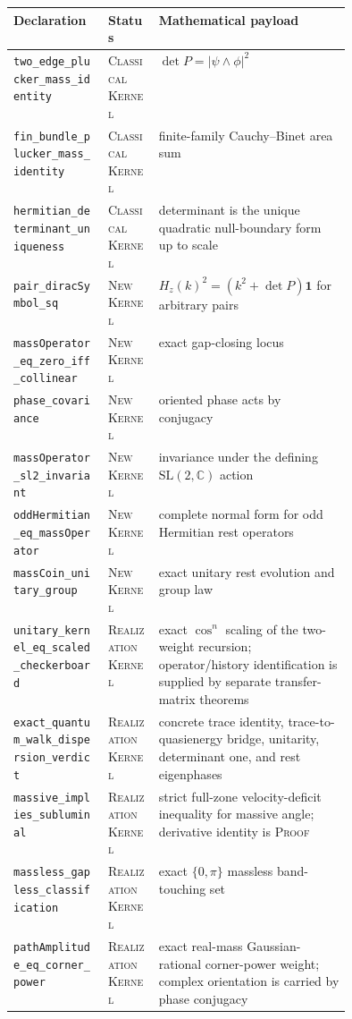 \documentclass[11pt]{article}
\newcommand{\Kernel}{\textcolor{kernelcolor}{\textsc{Kernel}}}
\newcommand{\Human}{\textcolor{humanproofcolor}{\textsc{Proof}}}
\newcommand{\Classical}{\textcolor{classicalcolor}{\textsc{Classical}}}
\newcommand{\NewResult}{\textsc{New}}
\newcommand{\Realization}{\textsc{Realization}}
\newcommand{\C}{\mathbb{C}}
\newcommand{\id}{\mathbf{1}}
\begin{document}
\begin{center}
\small
\begin{tabularx}{\linewidth}{@{}p{0.29\linewidth}p{0.15\linewidth}X@{}}
\toprule
Declaration & Status & Mathematical payload\\
\midrule
\texttt{two\_edge\_plucker\_mass\_identity}
 & \Classical{} \Kernel{} & $\det P=|\psi\wedge\phi|^2$\\
\texttt{fin\_bundle\_plucker\_mass\_identity}
 & \Classical{} \Kernel{} & finite-family Cauchy--Binet area sum\\
\texttt{hermitian\_determinant\_uniqueness}
 & \Classical{} \Kernel{} & determinant is the unique quadratic null-boundary form up to scale\\
\texttt{pair\_diracSymbol\_sq}
 & \NewResult{} \Kernel{} & $H_z(k)^2=(k^2+\det P)\id$ for arbitrary pairs\\
\texttt{massOperator\_eq\_zero\_iff\_collinear}
 & \NewResult{} \Kernel{} & exact gap-closing locus\\
\texttt{phase\_covariance}
 & \NewResult{} \Kernel{} & oriented phase acts by conjugacy\\
\texttt{massOperator\_sl2\_invariant}
 & \NewResult{} \Kernel{} & invariance under the defining $\mathrm{SL}(2,\C)$ action\\
\texttt{oddHermitian\_eq\_massOperator}
 & \NewResult{} \Kernel{} & complete normal form for odd Hermitian rest operators\\
\texttt{massCoin\_unitary\_group}
 & \NewResult{} \Kernel{} & exact unitary rest evolution and group law\\
\texttt{unitary\_kernel\_eq\_scaled\_checkerboard}
 & \Realization{} \Kernel{} & exact $\cos^n$ scaling of the two-weight recursion; operator/history identification is supplied by separate transfer-matrix theorems\\
\texttt{exact\_quantum\_walk\_dispersion\_verdict}
 & \Realization{} \Kernel{} & concrete trace identity, trace-to-quasienergy bridge, unitarity, determinant one, and rest eigenphases\\
\texttt{massive\_implies\_subluminal}
 & \Realization{} \Kernel{} & strict full-zone velocity-deficit inequality for massive angle; derivative identity is \Human{}\\
\texttt{massless\_gapless\_classification}
 & \Realization{} \Kernel{} & exact $\{0,\pi\}$ massless band-touching set\\
\texttt{pathAmplitude\_eq\_corner\_power}
 & \Realization{} \Kernel{} & exact real-mass Gaussian-rational corner-power weight; complex orientation is carried by phase conjugacy\\

\end{tabularx}
\end{center}
\end{document}
